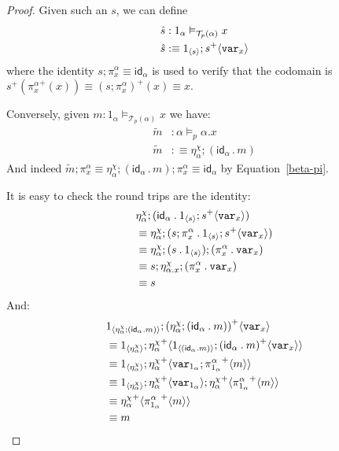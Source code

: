 \documentclass[10pt]{article}
\theoremstyle{definition}
\newcommand{\id}{\mathsf{id}}
\newcommand\TrPlus[2]{\ensuremath{{#1}^+(#2)}}
\newcommand\El[2]{\mathcal{T}_{#1}(#2)}
\newcommand\bdot[0]{\mathbin{.}}
\newcommand\ApPlus[2]{\ensuremath{{#1}^+ \langle #2 \rangle }}
\begin{document}
\begin{proof}
Given such an $s$, we can define
\begin{align*}
\hat{s} &: 1_\alpha \vDash_{\El{p}{\alpha}} x \\
\hat{s} &:\equiv \ApOne{s};\ApPlus{s}{\var{x}}
\end{align*}
where the identity $s;\pi^\alpha_x \equiv \id_\alpha$ is used to verify that the codomain is $\TrPlus{s}{\TrPlus{\pi^\alpha_x}{x}} \equiv \TrPlus{(s;\pi^\alpha_x)}{x} \equiv x$.

Conversely, given $m : 1_\alpha \vDash_{\El{p}{\alpha}} x$ we have:
\begin{align*}
\tilde{m} &: \alpha \vDash_p \alpha.x \\
\tilde{m} &:\equiv \eta^\chi_\alpha ; (\id_\alpha \bdot m)
\end{align*}
And indeed $\tilde{m};\pi^\alpha_x \equiv \eta^\chi_\alpha ; (\id_\alpha \bdot m);\pi^\alpha_x \equiv \id_\alpha$ by Equation~\eqref{beta-pi}.

It is easy to check the round trips are the identity:
\begin{align*}
&\eta^\chi_\alpha ; (\id_\alpha \bdot \ApOne{s};\ApPlus{s}{\var{x}}) \\
&\equiv \eta^\chi_\alpha ; (s;\pi^\alpha_x \bdot \ApOne{s};\ApPlus{s}{\var{x}}) \\
&\equiv \eta^\chi_\alpha ; (s \bdot \ApOne{s});(\pi^\alpha_x \bdot \var{x}) \\
&\equiv s;\eta^\chi_{\alpha.x} ; (\pi^\alpha_x \bdot \var{x}) \\
&\equiv s
\end{align*}
And:
\begin{align*}
&\ApOne{\eta^\chi_\alpha ; (\id_\alpha \bdot m)};\ApPlus{(\eta^\chi_\alpha ; (\id_\alpha \bdot m))}{\var{x}} \\
&\equiv \ApOne{\eta^\chi_\alpha};\ApPlus{\eta^\chi_\alpha}{\ApOne{(\id_\alpha \bdot m)};\ApPlus{(\id_\alpha \bdot m)}{\var{x}}} \\
&\equiv \ApOne{\eta^\chi_\alpha};\ApPlus{\eta^\chi_\alpha}{\var{1_\alpha};\ApPlus{\pi^\alpha_{1_\alpha}}{m}} \\
&\equiv \ApOne{\eta^\chi_\alpha};\ApPlus{\eta^\chi_\alpha}{\var{1_\alpha}};\ApPlus{\eta^\chi_\alpha}{\ApPlus{\pi^\alpha_{1_\alpha}}{m}} \\
&\equiv \ApPlus{\eta^\chi_\alpha}{\ApPlus{\pi^\alpha_{1_\alpha}}{m}} \\
&\equiv m
\end{align*}
\end{proof}
\end{document}
